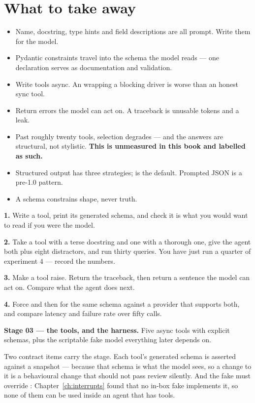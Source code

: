 \section{What to take away}
\label{sec:ch6-summary}

\begin{itemize}[leftmargin=1.4em]
\item Name, docstring, type hints and field descriptions are all prompt. Write
      them for the model.
\item Pydantic constraints travel into the schema the model reads --- one
      declaration serves as documentation and validation.
\item Write tools async. An  wrapping a blocking driver is worse
      than an honest sync tool.
\item Return errors the model can act on. A traceback is unusable tokens and a
      leak.
\item Past roughly twenty tools, selection degrades --- and the answers are
      structural, not stylistic. \textbf{This is unmeasured in this book and
      labelled as such.}
\item Structured output has three strategies;  is the default.
      Prompted JSON is a pre-1.0 pattern.
\item A schema constrains shape, never truth.
\end{itemize}

\begin{exercisebox}
\textbf{1.} Write a tool, print its generated schema, and check it is what you
would want to read if you were the model.

\textbf{2.} Take a tool with a terse docstring and one with a thorough one, give
the agent both plus eight distractors, and run thirty queries. You have just run
a quarter of experiment 4 --- record the numbers.

\textbf{3.} Make a tool raise. Return the traceback, then return a sentence the
model can act on. Compare what the agent does next.

\textbf{4.} Force  and then  for the same
schema against a provider that supports both, and compare latency and failure
rate over fifty calls.
\end{exercisebox}

\begin{projectbox}
\textbf{Stage 03 --- the tools, and the harness.} Five async tools with explicit
schemas, plus the scriptable fake model everything later depends on.

Two contract items carry the stage. Each tool's generated schema is asserted
against a snapshot --- because that schema is what the model sees, so a change to
it is a behavioural change that should not pass review silently. And the fake
must override : Chapter~\ref{ch:interrupts} found that no
in-box fake implements it, so none of them can be used inside an agent that has
tools.
\end{projectbox}

